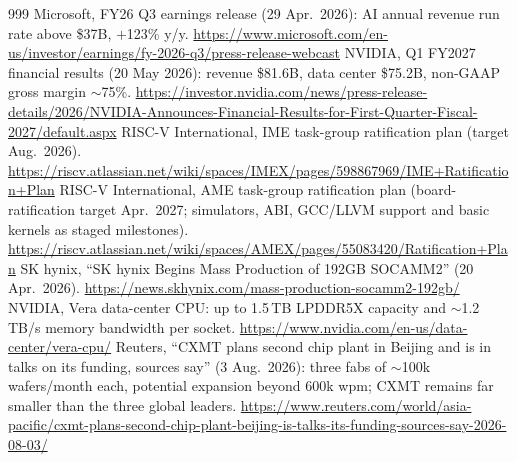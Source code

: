 \begin{thebibliography}{999}
 Microsoft, FY26 Q3 earnings release (29 Apr.\ 2026): AI annual revenue run rate above \$37B, $+$123\% y/y. \url{https://www.microsoft.com/en-us/investor/earnings/fy-2026-q3/press-release-webcast}
 NVIDIA, Q1 FY2027 financial results (20 May 2026): revenue \$81.6B, data center \$75.2B, non-GAAP gross margin $\sim$75\%. \url{https://investor.nvidia.com/news/press-release-details/2026/NVIDIA-Announces-Financial-Results-for-First-Quarter-Fiscal-2027/default.aspx}
 RISC-V International, IME task-group ratification plan (target Aug.\ 2026). \url{https://riscv.atlassian.net/wiki/spaces/IMEX/pages/598867969/IME+Ratification+Plan}
 RISC-V International, AME task-group ratification plan (board-ratification target Apr.\ 2027; simulators, ABI, GCC/LLVM support and basic kernels as staged milestones). \url{https://riscv.atlassian.net/wiki/spaces/AMEX/pages/55083420/Ratification+Plan}
 SK hynix, ``SK hynix Begins Mass Production of 192GB SOCAMM2'' (20 Apr.\ 2026). \url{https://news.skhynix.com/mass-production-socamm2-192gb/}
 NVIDIA, Vera data-center CPU: up to 1.5\,TB LPDDR5X capacity and $\sim$1.2\,TB/s memory bandwidth per socket. \url{https://www.nvidia.com/en-us/data-center/vera-cpu/}
 Reuters, ``CXMT plans second chip plant in Beijing and is in talks on its funding, sources say'' (3 Aug.\ 2026): three fabs of $\sim$100k wafers/month each, potential expansion beyond 600k wpm; CXMT remains far smaller than the three global leaders. \url{https://www.reuters.com/world/asia-pacific/cxmt-plans-second-chip-plant-beijing-is-talks-its-funding-sources-say-2026-08-03/}


\end{thebibliography}
